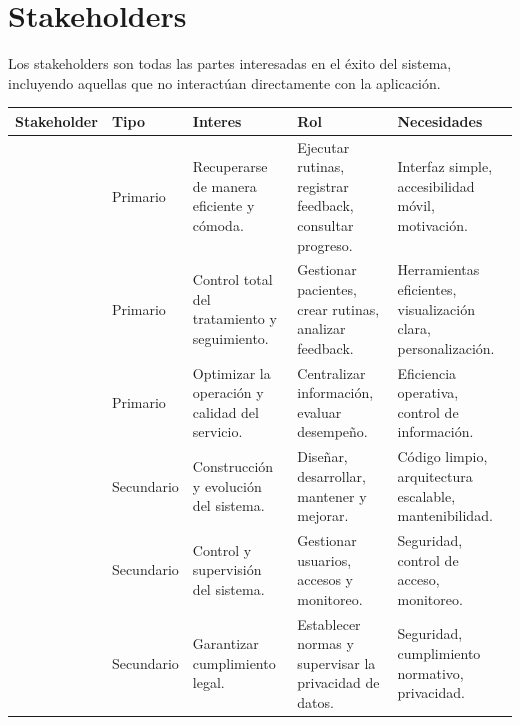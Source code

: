 \section{Stakeholders}

Los stakeholders son todas las partes interesadas en el éxito del sistema, incluyendo aquellas que no interactúan directamente con la aplicación.

\begin{longtable}{L{2.6cm} L{1.7cm} L{3.1cm} L{3.4cm} L{3.4cm}}
  \toprule
  \textbf{\color{fmAccent}Stakeholder} &
  \textbf{\color{fmAccent}Tipo} &
  \textbf{\color{fmAccent}Interes} &
  \textbf{\color{fmAccent}Rol} &
  \textbf{\color{fmAccent}Necesidades} \\
  \midrule
  \endhead

   & Primario &
  Recuperarse de manera eficiente y cómoda. &
  Ejecutar rutinas, registrar feedback, consultar progreso. &
  Interfaz simple, accesibilidad móvil, motivación. \\

   & Primario &
  Control total del tratamiento y seguimiento. &
  Gestionar pacientes, crear rutinas, analizar feedback. &
  Herramientas eficientes, visualización clara, personalización. \\

   & Primario &
  Optimizar la operación y calidad del servicio. &
  Centralizar información, evaluar desempeño. &
  Eficiencia operativa, control de información. \\

   & Secundario &
  Construcción y evolución del sistema. &
  Diseñar, desarrollar, mantener y mejorar. &
  Código limpio, arquitectura escalable, mantenibilidad. \\

   & Secundario &
  Control y supervisión del sistema. &
  Gestionar usuarios, accesos y monitoreo. &
  Seguridad, control de acceso, monitoreo. \\

   & Secundario &
  Garantizar cumplimiento legal. &
  Establecer normas y supervisar la privacidad de datos. &
  Seguridad, cumplimiento normativo, privacidad. \\

  \bottomrule
\end{longtable}
